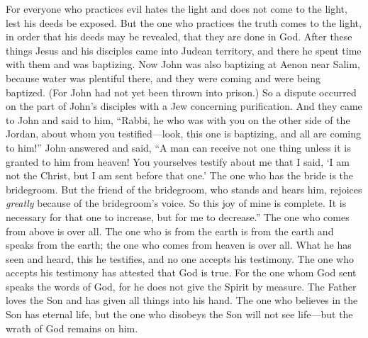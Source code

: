 \begin{biblechapter}
\verse For everyone who practices evil hates the light and does not come to the light, lest his deeds be exposed.
\verse But the one who practices the truth comes to the light, in order that his deeds may be revealed, that they are done in God.
 After these things Jesus and his disciples came into Judean territory, and there he spent time with them and was baptizing.
\verse Now John was also baptizing at Aenon near Salim, because water was plentiful there, and they were coming and were being baptized.
\verse (For John had not yet been thrown into prison.)
\verse So a dispute occurred on the part of John’s disciples with a Jew concerning purification.
\verse And they came to John and said to him, “Rabbi, he who was with you on the other side of the Jordan, about whom you testified—look, this one is baptizing, and all are coming to him!”
\verse John answered and said, “A man can receive not one thing unless it is granted to him from heaven!
\verse You yourselves testify about me that I said, ‘I am not the Christ, but I am sent before that one.’
\verse The one who has the bride is the bridegroom. But the friend of the bridegroom, who stands and hears him, rejoices \textit{greatly} because of the bridegroom’s voice. So this joy of mine is complete.
\verse It is necessary for that one to increase, but for me to decrease.”
\verse The one who comes from above is over all. The one who is from the earth is from the earth and speaks from the earth; the one who comes from heaven is over all.
\verse What he has seen and heard, this he testifies, and no one accepts his testimony.
\verse The one who accepts his testimony has attested that God is true.
\verse For the one whom God sent speaks the words of God, for he does not give the Spirit by measure.
\verse The Father loves the Son and has given all things into his hand.
\verse The one who believes in the Son has eternal life, but the one who disobeys the Son will not see life—but the wrath of God remains on him.
\end{biblechapter}

